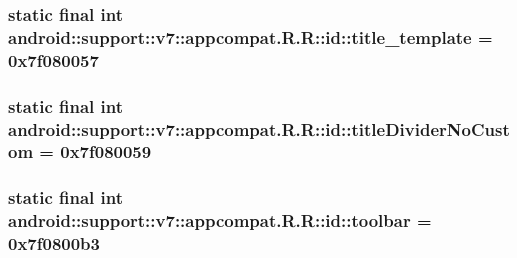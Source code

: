\hypertarget{classandroid_1_1support_1_1v7_1_1appcompat_1_1_r_1_1id_1921263c9481ab32791e642754c3f48b}{
\subsubsection[{title\_\-template}]{\setlength{\rightskip}{0pt plus 5cm}static final int android::support::v7::appcompat.R.R::id::title\_\-template = 0x7f080057}}
\label{classandroid_1_1support_1_1v7_1_1appcompat_1_1_r_1_1id_1921263c9481ab32791e642754c3f48b}


\hypertarget{classandroid_1_1support_1_1v7_1_1appcompat_1_1_r_1_1id_13498a9d9d84e712885a91c75111fc8f}{
\subsubsection[{titleDividerNoCustom}]{\setlength{\rightskip}{0pt plus 5cm}static final int android::support::v7::appcompat.R.R::id::titleDividerNoCustom = 0x7f080059}}
\label{classandroid_1_1support_1_1v7_1_1appcompat_1_1_r_1_1id_13498a9d9d84e712885a91c75111fc8f}


\hypertarget{classandroid_1_1support_1_1v7_1_1appcompat_1_1_r_1_1id_1f100f315da3e672d3b475abd9c8b3a8}{
\subsubsection[{toolbar}]{\setlength{\rightskip}{0pt plus 5cm}static final int android::support::v7::appcompat.R.R::id::toolbar = 0x7f0800b3}}
\label{classandroid_1_1support_1_1v7_1_1appcompat_1_1_r_1_1id_1f100f315da3e672d3b475abd9c8b3a8}



